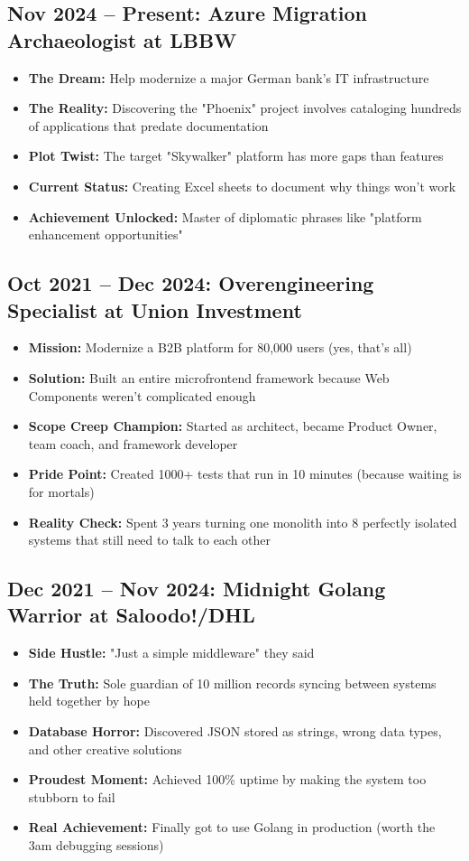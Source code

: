 \documentclass[11pt,a4paper]{article}
\begin{document}
\subsection*{Nov 2024 -- Present: Azure Migration Archaeologist at LBBW}
\begin{itemize}
\item \textbf{The Dream:} Help modernize a major German bank's IT infrastructure
\item \textbf{The Reality:} Discovering the "Phoenix" project involves cataloging hundreds of applications that predate documentation
\item \textbf{Plot Twist:} The target "Skywalker" platform has more gaps than features
\item \textbf{Current Status:} Creating Excel sheets to document why things won't work
\item \textbf{Achievement Unlocked:} Master of diplomatic phrases like "platform enhancement opportunities"
\end{itemize}

\subsection*{Oct 2021 -- Dec 2024: Overengineering Specialist at Union Investment}
\begin{itemize}
\item \textbf{Mission:} Modernize a B2B platform for 80,000 users (yes, that's all)
\item \textbf{Solution:} Built an entire microfrontend framework because Web Components weren't complicated enough
\item \textbf{Scope Creep Champion:} Started as architect, became Product Owner, team coach, and framework developer
\item \textbf{Pride Point:} Created 1000+ tests that run in 10 minutes (because waiting is for mortals)
\item \textbf{Reality Check:} Spent 3 years turning one monolith into 8 perfectly isolated systems that still need to talk to each other
\end{itemize}

\subsection*{Dec 2021 -- Nov 2024: Midnight Golang Warrior at Saloodo!/DHL}
\begin{itemize}
\item \textbf{Side Hustle:} "Just a simple middleware" they said
\item \textbf{The Truth:} Sole guardian of 10 million records syncing between systems held together by hope
\item \textbf{Database Horror:} Discovered JSON stored as strings, wrong data types, and other creative solutions
\item \textbf{Proudest Moment:} Achieved 100\% uptime by making the system too stubborn to fail
\item \textbf{Real Achievement:} Finally got to use Golang in production (worth the 3am debugging sessions)
\end{itemize}
\end{document}
